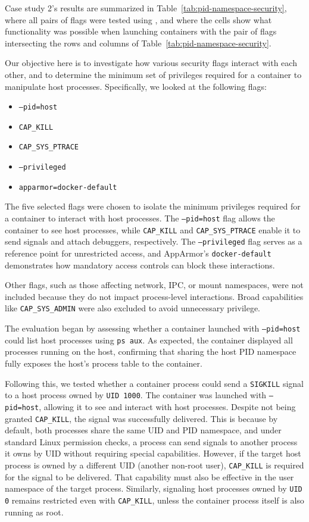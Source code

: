 Case study 2's results are summarized in Table~\ref{tab:pid-namespace-security}, where all pairs of flags were tested using \houdini, and where the cells show what functionality was possible when launching containers with the pair of flags intersecting the rows and columns of Table~\ref{tab:pid-namespace-security}. 

Our objective here is to investigate how various security flags interact with each other, and to determine the minimum set of privileges required for a container to manipulate host processes. Specifically, we looked at the following flags:

\begin{itemize}
    \item \texttt{--pid=host}
    \item \texttt{CAP\_KILL}
    \item \texttt{CAP\_SYS\_PTRACE}
    \item \texttt{--privileged}
    \item \texttt{apparmor=docker-default}
\end{itemize}

The five selected flags were chosen to isolate the minimum privileges required for a container to interact with host processes. The \texttt{--pid=host} flag allows the container to see host processes, while \texttt{CAP\_KILL} and \texttt{CAP\_SYS\_PTRACE} enable it to send signals and attach debuggers, respectively. The \texttt{--privileged} flag serves as a reference point for unrestricted access, and AppArmor's \texttt{docker-default} demonstrates how mandatory access controls can block these interactions.

Other flags, such as those affecting network, IPC, or mount namespaces, were not included because they do not impact process-level interactions. Broad capabilities like \texttt{CAP\_SYS\_ADMIN} were also excluded to avoid unnecessary privilege.

The evaluation began by assessing whether a container launched with \texttt{--pid=host} could list host processes using \texttt{ps aux}. As expected, the container displayed all processes running on the host, confirming that sharing the host PID namespace fully exposes the host's process table to the container.

Following this, we tested whether a container process could send a \texttt{SIGKILL} signal to a host process owned by \texttt{UID 1000}. The container was launched with \texttt{--pid=host}, allowing it to see and interact with host processes. Despite not being granted \texttt{CAP\_KILL}, the signal was successfully delivered. This is because by default, both processes share the same UID and PID namespace, and under standard Linux permission checks, a process can send signals to another process it owns by UID without requiring special capabilities. However, if the target host process is owned by a different UID (another non-root user), \texttt{CAP\_KILL} is required for the signal to be delivered. That capability must also be effective in the user namespace of the target process. Similarly, signaling host processes owned by \texttt{UID 0} remains restricted even with \texttt{CAP\_KILL}, unless the container process itself is also running as root.


